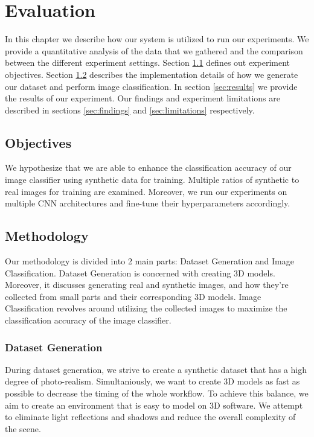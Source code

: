 \chapter{Evaluation}\label{ch:evaluation}

In this chapter we describe how our system is utilized to run our experiments. We provide a quantitative analysis of the data that we gathered and the comparison between the different experiment settings. Section \ref{sec:objectives} defines out experiment objectives. Section \ref{sec:methodology} describes the implementation details of how we generate our dataset and perform image classification. In section \ref{sec:results} we provide the results of our experiment. Our findings and experiment limitations are described in sections \ref{sec:findings} and \ref{sec:limitations} respectively.

\section{Objectives}\label{sec:objectives}

We hypothesize that we are able to enhance the classification accuracy of our image classifier using synthetic data for training. Multiple ratios of synthetic to real images for training are examined. Moreover, we run our experiments on multiple CNN architectures and fine-tune their hyperparameters accordingly.


\section{Methodology}\label{sec:methodology}

Our methodology is divided into 2 main parts: Dataset Generation and Image Classification. Dataset Generation is concerned with creating 3D models. Moreover, it discusses generating real and synthetic images, and how they're collected from small parts and their corresponding 3D models. Image Classification revolves around utilizing the collected images to maximize the classification accuracy of the image classifier.


\subsection{Dataset Generation}

During dataset generation, we strive to create a synthetic dataset that has a high degree of photo-realism. Simultaniously, we want to create 3D models as fast as possible to decrease the timing of the whole workflow. To achieve this balance, we aim to create an environment that is easy to model on 3D software. We attempt to eliminate light reflections and shadows and reduce the overall complexity of the scene.

